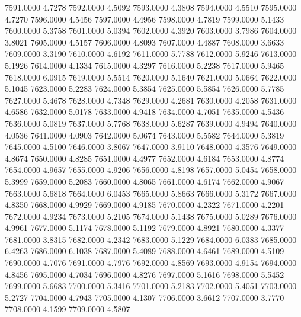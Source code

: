 7591.0000      4.7278
7592.0000      4.5092
7593.0000      4.3808
7594.0000      4.5510
7595.0000      4.7270
7596.0000      4.5456
7597.0000      4.4956
7598.0000      4.7819
7599.0000      5.1433
7600.0000      5.3758
7601.0000      5.0394
7602.0000      4.3920
7603.0000      3.7986
7604.0000      3.8021
7605.0000      4.5157
7606.0000      4.8093
7607.0000      4.4887
7608.0000      3.6633
7609.0000      3.3190
7610.0000      4.6192
7611.0000      5.7788
7612.0000      5.9246
7613.0000      5.1926
7614.0000      4.1334
7615.0000      4.3297
7616.0000      5.2238
7617.0000      5.9465
7618.0000      6.0915
7619.0000      5.5514
7620.0000      5.1640
7621.0000      5.0664
7622.0000      5.1045
7623.0000      5.2283
7624.0000      5.3854
7625.0000      5.5854
7626.0000      5.7785
7627.0000      5.4678
7628.0000      4.7348
7629.0000      4.2681
7630.0000      4.2058
7631.0000      4.6586
7632.0000      5.0178
7633.0000      4.9418
7634.0000      4.7051
7635.0000      4.5436
7636.0000      5.0819
7637.0000      5.7768
7638.0000      5.6287
7639.0000      4.9494
7640.0000      4.0536
7641.0000      4.0903
7642.0000      5.0674
7643.0000      5.5582
7644.0000      5.3819
7645.0000      4.5100
7646.0000      3.8067
7647.0000      3.9110
7648.0000      4.3576
7649.0000      4.8674
7650.0000      4.8285
7651.0000      4.4977
7652.0000      4.6184
7653.0000      4.8774
7654.0000      4.9657
7655.0000      4.9206
7656.0000      4.8198
7657.0000      5.0454
7658.0000      5.3999
7659.0000      5.2083
7660.0000      4.8065
7661.0000      4.6174
7662.0000      4.9067
7663.0000      5.6818
7664.0000      6.0453
7665.0000      5.8663
7666.0000      5.3172
7667.0000      4.8350
7668.0000      4.9929
7669.0000      4.9185
7670.0000      4.2322
7671.0000      4.2201
7672.0000      4.9234
7673.0000      5.2105
7674.0000      5.1438
7675.0000      5.0289
7676.0000      4.9961
7677.0000      5.1174
7678.0000      5.1192
7679.0000      4.8921
7680.0000      4.3377
7681.0000      3.8315
7682.0000      4.2342
7683.0000      5.1229
7684.0000      6.0383
7685.0000      6.4263
7686.0000      6.1038
7687.0000      5.4089
7688.0000      4.6461
7689.0000      4.5109
7690.0000      4.7076
7691.0000      4.7976
7692.0000      4.8569
7693.0000      4.9154
7694.0000      4.8456
7695.0000      4.7034
7696.0000      4.8276
7697.0000      5.1616
7698.0000      5.5452
7699.0000      5.6683
7700.0000      5.3416
7701.0000      5.2183
7702.0000      5.4051
7703.0000      5.2727
7704.0000      4.7943
7705.0000      4.1307
7706.0000      3.6612
7707.0000      3.7770
7708.0000      4.1599
7709.0000      4.5807
